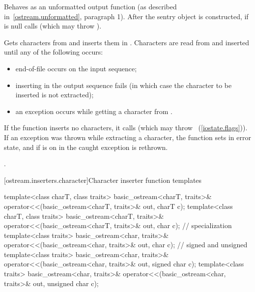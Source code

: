 \begin{itemdescr}
\pnum
\effects
Behaves as an unformatted output function (as described in~\ref{ostream.unformatted}, paragraph 1).
After the sentry object is
constructed, if
 is null calls
(which may throw
).

\pnum
Gets characters from 
and inserts them in
.
Characters are read from 
and inserted until any of the following occurs:
\begin{itemize}
\item
end-of-file occurs on the input sequence;
\item
inserting in the output sequence fails
(in which case the character to be inserted is not extracted);
\item
an exception occurs while getting a character from .
\end{itemize}

\pnum
If the function inserts no characters, it calls
(which may throw
~(\ref{iostate.flags})).
If an exception was thrown while extracting a character,
the function sets
in error state, and if
is on in
the caught exception is rethrown.

\pnum
\returns
{}.
\end{itemdescr}

[ostream.inserters.character]{Character inserter function templates}

%
%
\begin{itemdecl}
template<class charT, class traits>
  basic_ostream<charT, traits>& operator<<(basic_ostream<charT, traits>& out,
                                           charT c);
template<class charT, class traits>
  basic_ostream<charT, traits>& operator<<(basic_ostream<charT, traits>& out,
                                           char c);
  // specialization
template<class traits>
  basic_ostream<char, traits>& operator<<(basic_ostream<char, traits>& out,
                                          char c);
  // signed and unsigned
template<class traits>
  basic_ostream<char, traits>& operator<<(basic_ostream<char, traits>& out,
                                          signed char c);
template<class traits>
  basic_ostream<char, traits>& operator<<(basic_ostream<char, traits>& out,
                                          unsigned char c);
\end{itemdecl}


